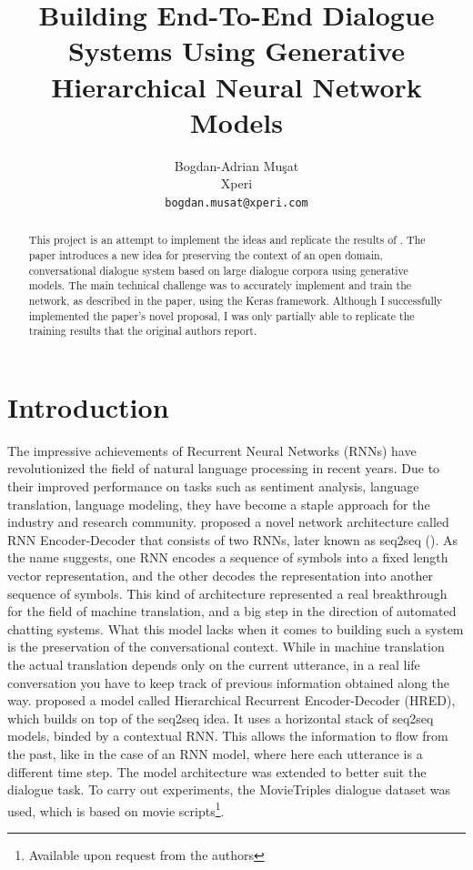 \documentclass{article}
\title{Building End-To-End Dialogue Systems Using Generative Hierarchical Neural Network Models}
\author{
  Bogdan-Adrian Mu\c sat \\
  Xperi\\
  \texttt{bogdan.musat@xperi.com} \\
}
\begin{document}

\maketitle

\begin{abstract}
  This project is an attempt to implement the ideas and replicate the results of \citet{DBLP:journals/corr/SerbanSBCP15}. The paper introduces a new idea for preserving the context of an open domain, conversational dialogue system based on large dialogue corpora using generative models. The main technical challenge was to accurately implement and train the network, as described in the paper, using the Keras framework. Although I successfully implemented the paper's novel proposal, I was only partially able to replicate the training results that the original authors report. 
\end{abstract}

\section{Introduction}

The impressive achievements of Recurrent Neural Networks (RNNs) have revolutionized the field of natural language processing in recent years. Due to their improved performance on tasks such as sentiment analysis, language translation, language modeling, they have become a staple approach for the industry and research community. \citet{DBLP:journals/corr/ChoMGBSB14} proposed a novel network architecture called RNN Encoder-Decoder that consists of two RNNs, later known as seq2seq (\citet{DBLP:journals/corr/SutskeverVL14}). As the name suggests, one RNN encodes a sequence of symbols into a fixed length vector representation, and the other decodes the representation into another sequence of symbols. This kind of architecture represented a real breakthrough for the field of machine translation, and a big step in the direction of automated chatting systems. What this model lacks when it comes to building such a system is the preservation of the conversational context. While in machine translation the actual translation depends only on the current utterance, in a real life conversation you have to keep track of previous information obtained along the way. \citet{DBLP:journals/corr/SordoniBVLSN15} proposed a model called Hierarchical Recurrent Encoder-Decoder (HRED), which builds on top of the seq2seq idea. It uses a horizontal stack of seq2seq models, binded by a contextual RNN. This allows the information to flow from the past, like in the case of an RNN model, where here each utterance is a different time step. The model architecture was extended to better suit the dialogue task. To carry out experiments, the MovieTriples dialogue dataset was used, which is based on movie scripts\footnote{Available upon request from the authors}.
\end{document}
